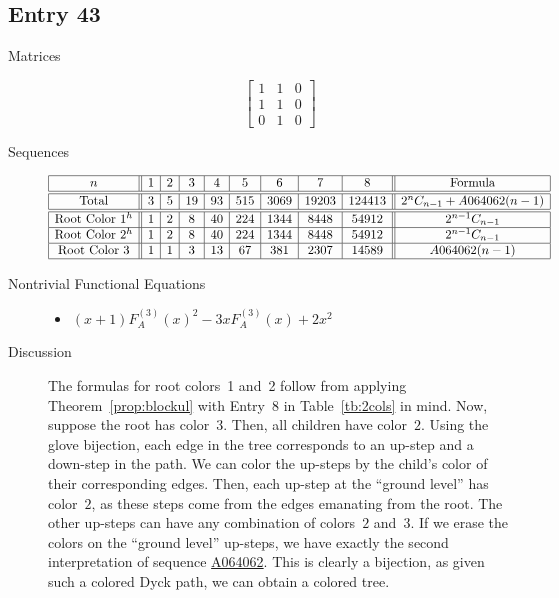 \documentclass[12pt]{amsart}
\newcommand{\seqnum}[1]{\href{https://oeis.org/#1}{#1}}
\newcommand{\gff}[2]{F_{#2}^{(#1)}(x)}
\newcommand{\gfa}[1]{\gff{#1}{A}}
\begin{document}
\subsection*{Entry 43}
\begin{description}
    \item[Matrices]
    
    \[\begin{bmatrix}
1 & 1 & 0 \\
1 & 1 & 0 \\
0 & 1 & 0
\end{bmatrix}\]
    \item[Sequences]\hspace*{\fill}\vspace{-0.5cm}
    \begin{center}
        \[
        \begin{array}{|c||c|c|c|c|c|c|c|c||c|}\hline
           n  & 1 & 2 & 3 & 4 & 5 & 6 & 7 & 8  & \text{Formula}\\\hline\hline
           \text{Total}  & 3 & 5 & 19 & 93 & 515 & 3069 & 19203 & 124413 & 2^{n}C_{n-1}+A064062(n-1)\\\hline\hline
           \text{Root Color }1^{h} & 1 & 2 & 8 & 40 & 224 & 1344 & 8448 & 54912 & 2^{n-1}C_{n-1}\\\hline
           \text{Root Color }2^{h} & 1 & 2 & 8 & 40 & 224 & 1344 & 8448 & 54912 & 2^{n-1}C_{n-1}\\\hline
           \text{Root Color }3 & 1 & 1 & 3 & 13 & 67 & 381 & 2307 & 14589 & A064062(n-1)\\\hline
        \end{array}
        \]
    \end{center}
    
    \item[Nontrivial Functional Equations]\hspace*{\fill}

    \begin{itemize}

\item $(x + 1)\gfa{3}^2-3x\gfa{3}+2x^2$


\end{itemize}
    \item[Discussion] 
    The formulas for root colors~1 and~2 follow from applying Theorem~\ref{prop:blockul} with Entry~8 in Table~\ref{tb:2cols} in mind.
    Now, suppose the root has color~3. Then, all children have color~$2$. Using the glove bijection, each edge in the tree corresponds to an up-step and a down-step in the path. We can color the up-steps by the child's color of their corresponding edges. Then, each up-step at the ``ground level'' has color~$2$, as these steps come from the edges emanating from the root. The other up-steps can have any combination of colors~$2$ and~$3$. If we erase the colors on the ``ground level'' up-steps, we have exactly the second interpretation of sequence \seqnum{A064062}. This is clearly a bijection, as given such a colored Dyck path, we can obtain a colored tree.
\end{description}
\end{document}
